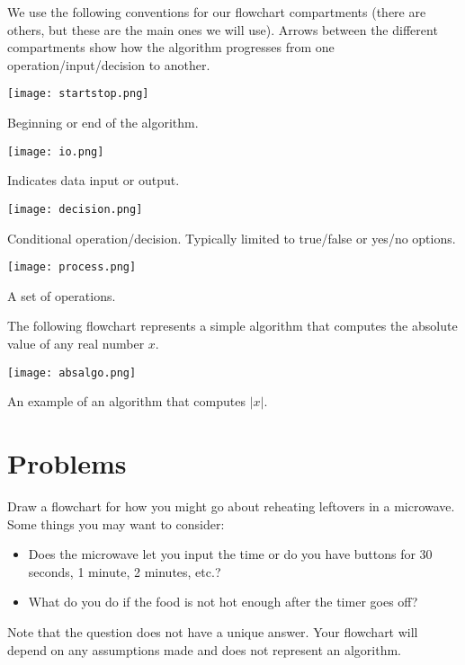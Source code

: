 \documentclass{ximera}
\begin{document}
We use the following conventions for our flowchart compartments (there are others, but these are the main ones we will use). Arrows between the different compartments show how the algorithm progresses from one operation/input/decision to another.

\begin{center}
	\texttt{[image: startstop.png]}
\end{center}
\begin{center}
	Beginning or end of the algorithm.
\end{center}

\begin{center}
	\texttt{[image: io.png]}
\end{center}
\begin{center}
	Indicates data input or output.
\end{center}

\begin{center}
	\texttt{[image: decision.png]}
\end{center}
\begin{center}
	Conditional operation/decision. Typically limited to true/false or yes/no options.
\end{center}

\begin{center}
	\texttt{[image: process.png]}
\end{center}
\begin{center}
	A set of operations.
\end{center}

The following flowchart represents a simple algorithm that computes the absolute value of any real number $x$.

\begin{center}
	\texttt{[image: absalgo.png]}
\end{center}
\begin{center}
	An example of an algorithm that computes $|x|$.
\end{center}

\section{Problems}

\begin{question}
	Draw a flowchart for how you might go about reheating leftovers in a microwave. Some things you may want to consider:
	\begin{itemize}
		\item Does the microwave let you input the time or do you have buttons for 30 seconds, 1 minute, 2 minutes, etc.?
		\item What do you do if the food is not hot enough after the timer goes off?
	\end{itemize}
	Note that the question does not have a unique answer. Your flowchart will depend on any assumptions made and does not represent an algorithm.
\end{question}
\end{document}
